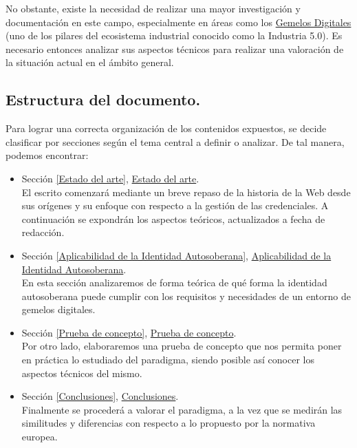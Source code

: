 \documentclass[../main.tex]{subfiles}
\begin{document}
No obstante, existe la necesidad de realizar una mayor investigación y documentación en este campo, especialmente en áreas como los \hyperref[Gemelos Digitales]{Gemelos Digitales} (uno de los pilares del ecosistema industrial conocido como la Industria 5.0). Es necesario entonces analizar sus aspectos técnicos para realizar una valoración de la situación actual en el ámbito general.

\subsection{Estructura del documento.}
Para lograr una correcta organización de los contenidos expuestos, se decide clasificar por secciones según el tema central a definir o analizar. De tal manera, podemos encontrar:

\begin{itemize}

    \item Sección \ref{Estado del arte}, \hyperref[Estado del arte]{Estado del arte}. \\
    El escrito comenzará mediante un breve repaso de la historia de la Web desde sus orígenes y su enfoque con respecto a la gestión de las credenciales. A continuación se expondrán los aspectos teóricos, actualizados a fecha de redacción.
   
    \item Sección \ref{Aplicabilidad de la Identidad Autosoberana}, \hyperref[Aplicabilidad de la Identidad Autosoberana]{Aplicabilidad de la Identidad Autosoberana}. \\
    En esta sección analizaremos de forma teórica de qué forma la identidad autosoberana puede cumplir con los requisitos y necesidades de un entorno de gemelos digitales.
   
    \item Sección \ref{Prueba de concepto}, \hyperref[Prueba de concepto]{Prueba de concepto}. \\ 
    Por otro lado, elaboraremos una prueba de concepto que nos permita poner en práctica lo estudiado del paradigma, siendo posible así conocer los aspectos técnicos del mismo.

    \item Sección \ref{Conclusiones}, \hyperref[Conclusiones]{Conclusiones}. \\
    Finalmente se procederá a valorar el paradigma, a la vez que se medirán las similitudes y diferencias con respecto a lo propuesto por la normativa europea. 
    
\end{itemize}
\end{document}
